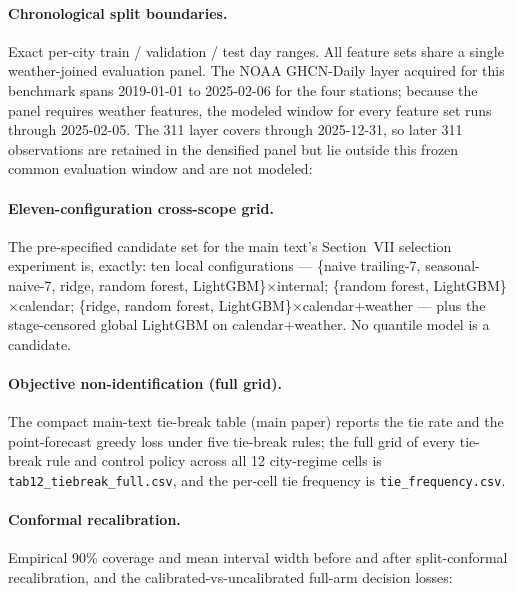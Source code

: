 \paragraph{Chronological split boundaries.} Exact per-city train /
validation / test day ranges. All feature sets share a single
weather-joined evaluation panel. The NOAA GHCN-Daily layer acquired for
this benchmark spans 2019-01-01 to 2025-02-06 for the four stations;
because the panel requires weather features, the modeled window for every
feature set runs through 2025-02-05. The 311 layer covers through
2025-12-31, so later 311 observations are retained in the densified panel
but lie outside this frozen common evaluation window and are not modeled:

{\footnotesize}

\paragraph{Eleven-configuration cross-scope grid.} The pre-specified
candidate set for the main text's Section~VII selection experiment is, exactly:
ten local configurations --- \{naive trailing-7, seasonal-naive-7, ridge,
random forest, LightGBM\}$\times$internal; \{random forest,
LightGBM\}$\times$calendar; \{ridge, random forest,
LightGBM\}$\times$calendar+weather --- plus the stage-censored global
LightGBM on calendar+weather. No quantile model is a candidate.

\paragraph{Objective non-identification (full grid).} The compact
main-text tie-break table (main paper) reports the tie rate and the
point-forecast greedy loss under five tie-break rules; the full grid of
every tie-break rule and control policy across all 12 city-regime cells is
\texttt{tab12\_tiebreak\_full.csv}, and the per-cell tie frequency is
\texttt{tie\_frequency.csv}.

\paragraph{Conformal recalibration.} Empirical 90\% coverage and mean
interval width before and after split-conformal recalibration, and the
calibrated-vs-uncalibrated full-arm decision losses:

\noindent\resizebox{\linewidth}{!}{}

